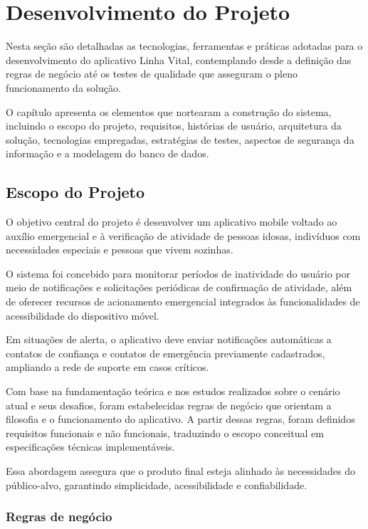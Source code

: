 \chapter{Desenvolvimento do Projeto}

Nesta seção são detalhadas as tecnologias, ferramentas e práticas adotadas para o desenvolvimento do aplicativo Linha Vital, contemplando desde a definição das regras de negócio até os testes de qualidade que asseguram o pleno funcionamento da solução.

O capítulo apresenta os elementos que nortearam a construção do sistema, incluindo o escopo do projeto, requisitos, histórias de usuário, arquitetura da solução, tecnologias empregadas, estratégias de testes, aspectos de segurança da informação e a modelagem do banco de dados.

\section{Escopo do Projeto}

O objetivo central do projeto é desenvolver um aplicativo mobile voltado ao auxílio emergencial e à verificação de atividade de pessoas idosas, indivíduos com necessidades especiais e pessoas que vivem sozinhas.

O sistema foi concebido para monitorar períodos de inatividade do usuário por meio de notificações e solicitações periódicas de confirmação de atividade, além de oferecer recursos de acionamento emergencial integrados às funcionalidades de acessibilidade do dispositivo móvel.

Em situações de alerta, o aplicativo deve enviar notificações automáticas a contatos de confiança e contatos de emergência previamente cadastrados, ampliando a rede de suporte em casos críticos.

Com base na fundamentação teórica e nos estudos realizados sobre o cenário atual e seus desafios, foram estabelecidas regras de negócio que orientam a filosofia e o funcionamento do aplicativo. A partir dessas regras, foram definidos requisitos funcionais e não funcionais, traduzindo o escopo conceitual em especificações técnicas implementáveis.

Essa abordagem assegura que o produto final esteja alinhado às necessidades do público-alvo, garantindo simplicidade, acessibilidade e confiabilidade.


\subsection{Regras de negócio}

